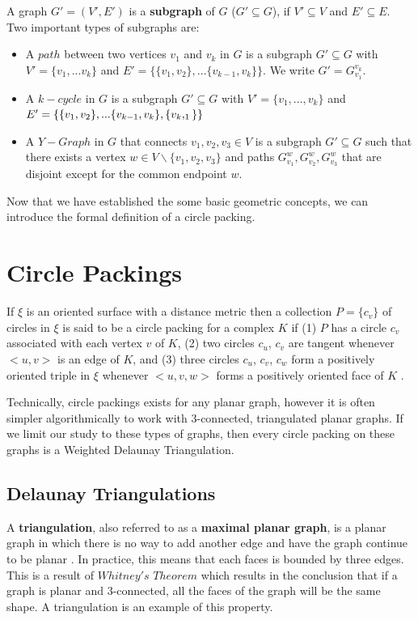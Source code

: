 \documentclass[11pt]{article}
\begin{document}
  A graph $G' = (V',E')$ is a \textbf{subgraph} of $G$ ($G' \subseteq G$), if $V' \subseteq V$ and $E' \subseteq E$. Two important types of subgraphs are:
  \begin{itemize}
  \item A $path$ between two vertices $v_1$ and $v_k$ in $G$ is a subgraph $G' \subseteq G$ with $V' = \{v_1,...v_k\}$ and 
  $E' 	= \{\{v_1,v_2\},...\{v_{k-1}, v_k\}\}$. We write $G' = G_{v_1}^{v_k}$.
  \item A $k-cycle$ in $G$ is a subgraph $G'\subseteq G$ with $V' = \{v_1,...,v_k\}$ and 
  $E' = \\ \{\{v_1,v_2\},...\{v_{k-1}, v_k\}, \{v_k,_1\}\}$
  \item A $Y-Graph$ in $G$ that connects $v_1,v_2, v_3 \in V$ is a subgraph $G' \subseteq G$ such that there exists a vertex $w \in V \backslash \{v_1,v_2, v_3\}$ and paths $G_{v_1}^w, G_{v_2}^w, G_{v_3}^w$ that are disjoint except for the common endpoint $w$.
  \end{itemize}
  
Now that we have established the some basic geometric concepts, we can introduce the formal definition of a circle packing.

\section{Circle Packings}
If $\xi$ is an oriented surface with a distance metric then a collection $P = \{c_v\}$ of circles in $\xi$ is said to be a circle packing for a complex $K$ if (1) $P$ has a circle $c_v$ associated with each vertex $v$ of $K$, (2) two circles $c_u$, $c_v$ are tangent whenever $<u,v>$ is an edge of $K$, and (3) three circles $c_u$, $c_v$, $c_w$ form a positively oriented triple in $\xi$ whenever $<u,v,w>$ forms a positively oriented face of $K$ \cite{stephenson05introduction}. 

Technically, circle packings exists for any planar graph, however it is often simpler algorithmically to work with 3-connected, triangulated planar graphs. If we limit our study to these types of graphs, then every circle packing on these graphs is a Weighted Delaunay Triangulation. 

\subsection{Delaunay Triangulations}
	A \textbf{triangulation}, also referred to as a \textbf{maximal planar graph}, is a planar graph in which there is no way to add another edge and have the graph continue to be planar \cite{meshGeneration}. In practice, this means that each faces is bounded by three edges. This is a result of $Whitney's$ $Theorem$ which results in the conclusion that if a graph is planar and 3-connected, all the faces of the graph will be the same shape. A triangulation is an example of this property. 
\end{document}

